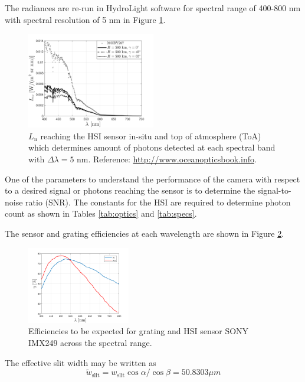 The radiances are re-run in HydroLight software for spectral range of 400-800 nm with spectral resolution of 5 nm in Figure \ref{fig:radiance}. 
\begin{figure}[htbp]
  \centering
      \includegraphics[width=0.5\textwidth]{figs/radiance.png}
  \caption{$L_u$ reaching the HSI sensor in-situ and top of atmosphere (ToA) which determines amount of photons detected at each spectral band with $\Delta \lambda =5$ nm. Reference: \url{http://www.oceanopticsbook.info}.}
	\label{fig:radiance}
\end{figure}

One of the parameters to understand the performance of the camera with respect to a desired signal or photons reaching the sensor is to determine the signal-to-noise ratio (SNR). The constants for the HSI are required to determine photon count as shown in Tables \ref{tab:optics} and \ref{tab:specs}.

The sensor and grating efficiencies at each wavelength are shown in Figure \ref{fig:optical_eff}.
\begin{figure}[H]
  \centering
      \includegraphics[width=0.4\textwidth]{figs/optical_eff.png}
  \caption{Efficiencies to be expected for grating and HSI sensor SONY IMX249 across the spectral range.}
	\label{fig:optical_eff}
\end{figure}

The effective slit width may be written as
\begin{equation}
\tilde{w}_{\text{slit}} = w_{\text{slit}}\cos\alpha/\cos\beta = 50.8303 \mu m
\end{equation}

